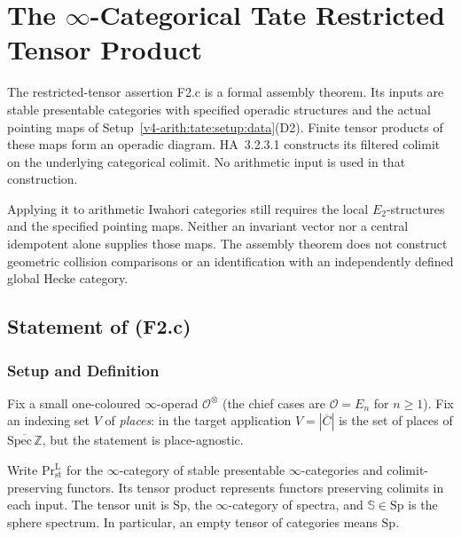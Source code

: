 \chapter{The \(\infty\)-Categorical Tate Restricted Tensor Product}
\label{v4-arith:tate-tensor}

The restricted-tensor assertion F2.c is a formal assembly theorem.
Its inputs are stable presentable categories with specified
operadic structures and the actual pointing
maps of Setup~\ref{v4-arith:tate:setup:data}(D2). Finite tensor
products of these maps form an operadic diagram. HA~3.2.3.1
constructs its filtered colimit on the underlying categorical
colimit. No arithmetic input is used in that construction.

Applying it to arithmetic Iwahori categories still requires the
local \(E_2\)-structures and the specified pointing maps. Neither
an invariant vector nor a central idempotent alone supplies those
maps. The assembly theorem does not construct geometric collision
comparisons or an identification with an independently defined
global Hecke category.

\section{Statement of (F2.c)}
\label{v4-arith:tate:statement}

\subsection{Setup and Definition}

Fix a small one-coloured \(\infty\)-operad \(\mathcal{O}^{\otimes}\) (the chief cases
are \(\mathcal{O}=E_{n}\) for \(n\geq 1\)). Fix an indexing set \(V\) of
\emph{places}: in the target application \(V=|\overline{C}|\) is the
set of places of \(\overline{\mathrm{Spec}\,\mathbb{Z}}\), but the
statement is place-agnostic.

Write \(\mathrm{Pr}^{\mathrm L}_{\mathrm{st}}\) for the
\(\infty\)-category of stable presentable \(\infty\)-categories and
colimit-preserving functors. Its tensor product represents
functors preserving colimits in each input. The tensor unit is
\(\mathrm{Sp}\), the \(\infty\)-category of spectra, and
\(\mathbb S\in\mathrm{Sp}\) is the sphere spectrum. In particular,
an empty tensor of categories means \(\mathrm{Sp}\).

